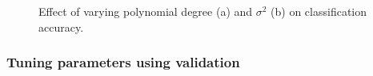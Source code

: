 \documentclass{article}
\begin{document}
\begin{figure}[h]
\begin{subfigure}[b]{0.4\textwidth}
                     \label{fig:rbf_sigma2}
                 \end{subfigure}
                 \hspace{0.05\textwidth}
                \caption{Effect of varying polynomial degree (a) and $\sigma^2$ (b) on classification accuracy. }
            \end{figure}
            
            
        \subsubsection{Tuning parameters using validation}
\end{document}
